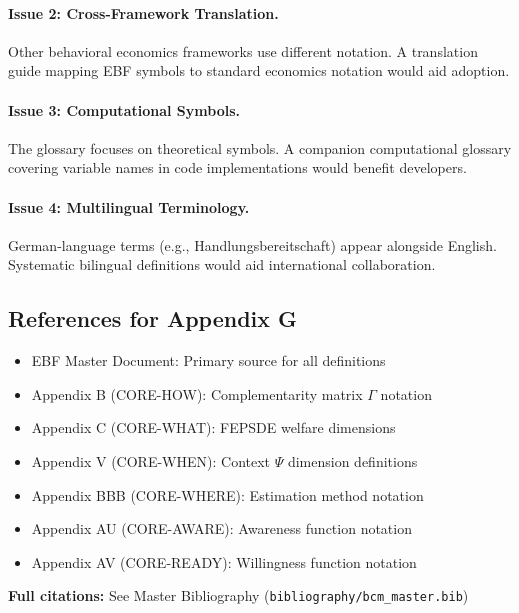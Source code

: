 \paragraph{Issue 2: Cross-Framework Translation.}
Other behavioral economics frameworks use different notation. A translation guide
mapping EBF symbols to standard economics notation would aid adoption.

\paragraph{Issue 3: Computational Symbols.}
The glossary focuses on theoretical symbols. A companion computational glossary
covering variable names in code implementations would benefit developers.

\paragraph{Issue 4: Multilingual Terminology.}
German-language terms (e.g., Handlungsbereitschaft) appear alongside English.
Systematic bilingual definitions would aid international collaboration.


\subsection{References for Appendix G}
\label{sec:glossary-references}

\begin{itemize}[nosep]
    \item EBF Master Document: Primary source for all definitions
    \item Appendix B (CORE-HOW): Complementarity matrix $\Gamma$ notation
    \item Appendix C (CORE-WHAT): FEPSDE welfare dimensions
    \item Appendix V (CORE-WHEN): Context $\Psi$ dimension definitions
    \item Appendix BBB (CORE-WHERE): Estimation method notation
    \item Appendix AU (CORE-AWARE): Awareness function notation
    \item Appendix AV (CORE-READY): Willingness function notation
\end{itemize}

\textbf{Full citations:} See Master Bibliography (\texttt{bibliography/bcm\_master.bib})

